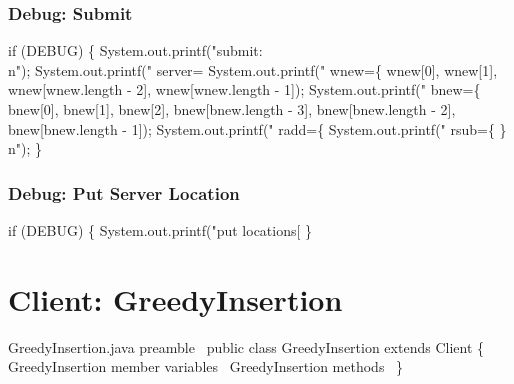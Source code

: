 \subsection{Debug: Submit}

\nwenddocs{}\endmoddef\nwstartdeflinemarkup{}\nwenddeflinemarkup
if (DEBUG) \{
  System.out.printf("submit:\\n");
  System.out.printf("  server=%
  System.out.printf("  wnew=\{ %
      wnew[0], wnew[1], wnew[wnew.length - 2], wnew[wnew.length - 1]);
  System.out.printf("  bnew=\{ %
      bnew[0], bnew[1], bnew[2],
      bnew[bnew.length - 3], bnew[bnew.length - 2], bnew[bnew.length - 1]);
  System.out.printf("  radd=\{ %
  System.out.printf("  rsub=\{ \}\\n");
\}
\nwendcode{}\nwdocspar

\subsection{Debug: Put Server Location}

\nwenddocs{}\endmoddef\nwstartdeflinemarkup{}\nwenddeflinemarkup
if (DEBUG) \{
  System.out.printf("put locations[%
\}
\nwendcode{}\nwdocspar

\nwenddocs{}\chapter{Client: GreedyInsertion}
\label{client-greedy}

\nwenddocs{}\endmoddef\nwstartdeflinemarkup\nwenddeflinemarkup
\LA{}GreedyInsertion.java preamble~{\nwtagstyle{}}\RA{}
public class GreedyInsertion extends Client \{
  \LA{}\code{}GreedyInsertion\edoc{} member variables~{\nwtagstyle{}}\RA{}
  \LA{}\code{}GreedyInsertion\edoc{} methods~{\nwtagstyle{}}\RA{}
\}
\nwendcode{}\nwdocspar

